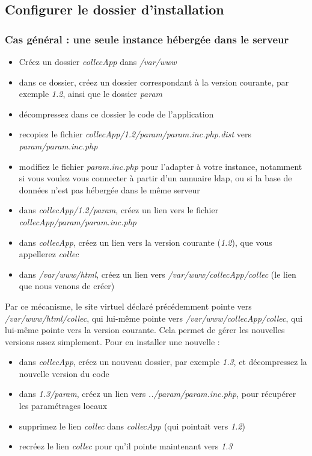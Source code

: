 \subsection{Configurer le dossier d'installation}

\subsubsection{Cas général : une seule instance hébergée dans le serveur}
\begin{itemize}
\item Créez un dossier \textit{collecApp} dans \textit{/var/www}
\item  dans ce dossier, créez un dossier correspondant à la version courante, par exemple \textit{1.2}, ainsi que le dossier \textit{param}
\item décompressez dans ce dossier le code de l'application
\item recopiez le fichier \textit{collecApp/1.2/param/param.inc.php.dist} vers \textit{param/param.inc.php}
\item modifiez le fichier \textit{param.inc.php} pour l'adapter à votre instance, notamment si vous voulez vous connecter à partir d'un annuaire ldap, ou si la base de données n'est pas hébergée dans le même serveur
\item dans \textit{collecApp/1.2/param}, créez un lien vers le fichier \textit{collecApp/param/param.inc.php}
\item  dans \textit{collecApp}, créez un lien vers la version courante (\textit{1.2}), que vous appellerez \textit{collec}
\item dans \textit{/var/www/html}, créez un lien vers \textit{/var/www/collecApp/collec} (le lien que nous venons de créer)
\end{itemize}

Par ce mécanisme, le site virtuel déclaré précédemment pointe vers \textit{/var/www/html/collec}, qui lui-même pointe vers \textit{/var/www/collecApp/collec}, qui lui-même pointe vers la version courante. Cela permet de gérer les nouvelles versions assez simplement. Pour en installer une nouvelle :
\begin{itemize}
\item dans \textit{collecApp}, créez un nouveau dossier, par exemple \textit{1.3}, et décompressez la nouvelle version du code
\item dans \textit{1.3/param}, créez un lien vers \textit{../param/param.inc.php}, pour récupérer les paramétrages locaux
\item supprimez le lien \textit{collec} dans \textit{collecApp} (qui pointait vers \textit{1.2})
\item recréez le lien \textit{collec} pour qu'il pointe maintenant vers \textit{1.3}
\end{itemize}

